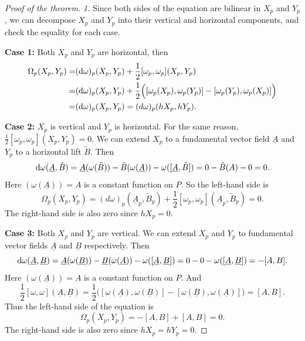 \begin{proof}[Proof of the theorem]
    \textit{1.} Since both sides of the equation are bilinear in $X_p$ and $Y_p$, we can decompose $X_p$ and $Y_p$ into their vertical and horizontal components, 
    and check the equality for each case.

    \noindent\textbf{Case 1:} Both $X_p$ and $Y_p$ are horizontal, then 
    \begin{align*}
        \Omega_p(X_p, Y_p) =& ({\rm d}\omega)_p(X_p, Y_p) + \frac{1}{2}[\omega_p, \omega_p](X_p, Y_p) \\
        =& ({\rm d}\omega)_p(X_p, Y_p) + \frac{1}{2}\Big([\omega_p(X_p), \omega_p(Y_p)] - [\omega_p(Y_p), \omega_p(X_p)]\Big) \\
        =& ({\rm d}\omega)_p(X_p, Y_p) = (d\omega)_p(hX_p, hY_p).
    \end{align*}

    \noindent\textbf{Case 2:} $X_p$ is vertical and $Y_p$ is horizontal. For the same reason, $\frac{1}{2}[\omega_p, \omega_p](X_p, Y_p) = 0$.
    We can extend $X_p$ to a fundamental vector field $\underline{A}$ and $Y_p$ to a horizontal lift $\tilde{B}$. Then
    \begin{equation*}
        {\rm d}\omega(\underline{A}, \tilde{B}) = \underline{A}(\omega(\tilde{B})) - \tilde{B}(\omega(\underline{A})) - \omega([\underline{A}, \tilde{B}]) 
        = 0 - \tilde{B}(A) - 0 = 0.
    \end{equation*}
    Here $(\omega(\underline{A})) = A$ is a constant function on $P$. So the left-hand side is 
    \begin{equation*}
        \Omega_p(X_p, Y_p) = (d\omega)_p(\underline{A}_p, \tilde{B}_p) + \frac{1}{2}[\omega_p, \omega_p](\underline{A}_p, \tilde{B}_p) = 0.
    \end{equation*}
    The right-hand side is also zero since $hX_p = 0$.

    \noindent\textbf{Case 3:} Both $X_p$ and $Y_p$ are vertical. 
    We can extend $X_p$ and $Y_p$ to fundamental vector fields $\underline{A}$ and $\underline{B}$ respectively. Then
    \begin{equation*}
        {\rm d}\omega(\underline{A}, \underline{B}) = \underline{A}(\omega(\underline{B})) - \underline{B}(\omega(\underline{A})) - \omega([\underline{A}, \underline{B}]) 
        = 0 - 0 - \omega([\underline{A}, \underline{B}]) = -[A, B].
    \end{equation*}
    Here $(\omega(\underline{A})) = A$ is a constant function on $P$. And 
    \begin{equation*}
        \frac{1}{2}[\omega, \omega](\underline{A}, \underline{B}) = \frac{1}{2}\Big([\omega(\underline{A}), \omega(\underline{B})] - [\omega(\underline{B}), \omega(\underline{A})]\Big) 
        = [A, B].
    \end{equation*}
    Thus the left-hand side of the equation is
    \begin{equation*}
        \Omega_p(X_p, Y_p) = -[A, B] + [A, B] = 0.
    \end{equation*}
    The right-hand side is also zero since $hX_p = hY_p = 0$.


\end{proof}
